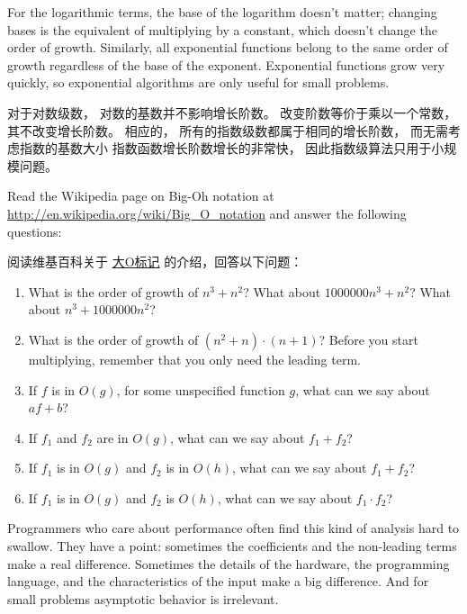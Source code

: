 For the logarithmic terms, the base of the logarithm doesn't matter;
changing bases is the equivalent of multiplying by a constant, which
doesn't change the order of growth.  Similarly, all exponential
functions belong to the same order of growth regardless of the base of
the exponent. Exponential functions grow very quickly, so exponential algorithms are only useful for small problems.

对于对数级数， 对数的基数并不影响增长阶数。
改变阶数等价于乘以一个常数， 其不改变增长阶数。
相应的， 所有的指数级数都属于相同的增长阶数， 而无需考虑指数的基数大小
指数函数增长阶数增长的非常快， 因此指数级算法只用于小规模问题。
  


\begin{exercise}

Read the Wikipedia page on Big-Oh notation at
\url{http://en.wikipedia.org/wiki/Big_O_notation} and
answer the following questions:

阅读维基百科关于 \href{http://en.wikipedia.org/wiki/Big_O_notation}{大O标记} 的介绍，回答以下问题：

\begin{enumerate}
\item What is the order of growth of $n^3 + n^2$?
What about $1000000 n^3 + n^2$?
What about $n^3 + 1000000 n^2$?

\item What is the order of growth of $(n^2 + n) \cdot (n + 1)$?  Before
  you start multiplying, remember that you only need the leading term.

\item If $f$ is in $O(g)$, for some unspecified function $g$, what can
  we say about $af+b$?

\item If $f_1$ and $f_2$ are in $O(g)$, what can we say about $f_1 + f_2$?

\item If  $f_1$ is in $O(g)$
and $f_2$ is in $O(h)$,
what can we say about  $f_1 + f_2$?

\item If  $f_1$ is in $O(g)$ and $f_2$ is $O(h)$,
what can we say about  $f_1 \cdot f_2$?
\end{enumerate}

\end{exercise}

Programmers who care about performance often find this kind of
analysis hard to swallow.  They have a point: sometimes the
coefficients and the non-leading terms make a real difference.
Sometimes the details of the hardware, the programming language, and
the characteristics of the input make a big difference.  And for small
problems asymptotic behavior is irrelevant.

